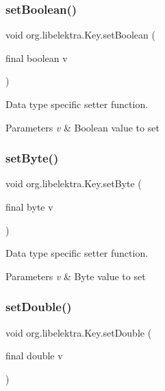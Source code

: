 \subsubsection{\texorpdfstring{setBoolean()}{setBoolean()}}
{\footnotesize\ttfamily void org.\+libelektra.\+Key.\+set\+Boolean (\begin{DoxyParamCaption}\item[{final boolean}]{v }\end{DoxyParamCaption})\hspace{0.3cm}{\ttfamily [inline]}}



Data type specific setter function. 


\begin{DoxyParams}{Parameters}
{\em v} & Boolean value to set \\
\hline
\end{DoxyParams}
\mbox{\label{classorg_1_1libelektra_1_1Key_ab9576c2e1e526ee23904a50b02386b45}} 
\subsubsection{\texorpdfstring{setByte()}{setByte()}}
{\footnotesize\ttfamily void org.\+libelektra.\+Key.\+set\+Byte (\begin{DoxyParamCaption}\item[{final byte}]{v }\end{DoxyParamCaption})\hspace{0.3cm}{\ttfamily [inline]}}



Data type specific setter function. 


\begin{DoxyParams}{Parameters}
{\em v} & Byte value to set \\
\hline
\end{DoxyParams}
\mbox{\label{classorg_1_1libelektra_1_1Key_a2c411133e9a8d13df30d08041678a5a0}} 
\subsubsection{\texorpdfstring{setDouble()}{setDouble()}}
{\footnotesize\ttfamily void org.\+libelektra.\+Key.\+set\+Double (\begin{DoxyParamCaption}\item[{final double}]{v }\end{DoxyParamCaption})\hspace{0.3cm}{\ttfamily [inline]}}



